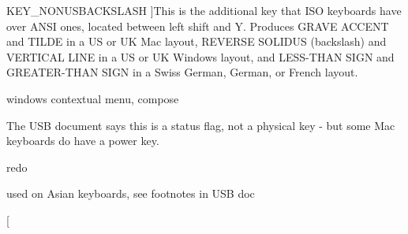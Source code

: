 \begin{Desc}
\begin{description}
{\hypertarget{classMezzanine_1_1MetaCode_a3b5633f0145bf3287cf53a3f05b5563ca6df6ef2f4f87cd863635313a7c73ded2}{
KEY\_\-NONUSBACKSLASH}
\label{classMezzanine_1_1MetaCode_a3b5633f0145bf3287cf53a3f05b5563ca6df6ef2f4f87cd863635313a7c73ded2}
}]This is the additional key that ISO keyboards have over ANSI ones, located between left shift and Y. Produces GRAVE ACCENT and TILDE in a US or UK Mac layout, REVERSE SOLIDUS (backslash) and VERTICAL LINE in a US or UK Windows layout, and LESS-\/THAN SIGN and GREATER-\/THAN SIGN in a Swiss German, German, or French layout. \item[{\em 
\hypertarget{classMezzanine_1_1MetaCode_a3b5633f0145bf3287cf53a3f05b5563cadf18e2b561df830d520652a79271f677}{
KEY\_\-APPLICATION}
\label{classMezzanine_1_1MetaCode_a3b5633f0145bf3287cf53a3f05b5563cadf18e2b561df830d520652a79271f677}
}]windows contextual menu, compose \item[{\em 
\hypertarget{classMezzanine_1_1MetaCode_a3b5633f0145bf3287cf53a3f05b5563cabd172c9969297155e90ffc5f59f2d44a}{
KEY\_\-POWER}
\label{classMezzanine_1_1MetaCode_a3b5633f0145bf3287cf53a3f05b5563cabd172c9969297155e90ffc5f59f2d44a}
}]The USB document says this is a status flag, not a physical key -\/ but some Mac keyboards do have a power key. \item[{\em 
\hypertarget{classMezzanine_1_1MetaCode_a3b5633f0145bf3287cf53a3f05b5563ca47b284cca42343cfa4a022a696682900}{
KEY\_\-AGAIN}
\label{classMezzanine_1_1MetaCode_a3b5633f0145bf3287cf53a3f05b5563ca47b284cca42343cfa4a022a696682900}
}]redo \item[{\em 
\hypertarget{classMezzanine_1_1MetaCode_a3b5633f0145bf3287cf53a3f05b5563ca460281c06ac23cd946038278895f077f}{
KEY\_\-INTERNATIONAL1}
\label{classMezzanine_1_1MetaCode_a3b5633f0145bf3287cf53a3f05b5563ca460281c06ac23cd946038278895f077f}
}]used on Asian keyboards, see footnotes in USB doc \item[{\em 
}
\end{description}
\end{Desc}
